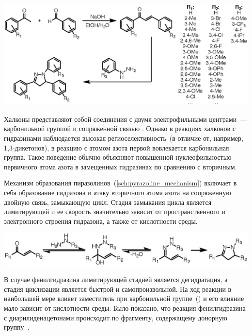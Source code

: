 \begin{scheme}
    \centering
    \includegraphics{sections/literature/img/pyrazolines_common.eps}
    \caption{}
\end{scheme}

Халконы представляют собой соединения с двумя электрофильными центрами~--- карбонильной группой и сопряженной связью .
Однако в реакциях халконов с гидразинами наблюдается высокая региоселективность~(в отличие от, например, 1,3-дикетонов), в реакцию с атомом азота первой вовлекается карбонильная группа.
Такое поведение обычно объясняют повышенной нуклеофильностью первичного атома азота в замещенных гидразинах по сравнению с вторичным.

Механизм образования пиразолинов~(\ref{sch:pyrazoline_mechanism}) включает в себя образование гидразона и атаку вторичного атома азота на сопряженную двойную связь, замыкающую цикл.
Стадия замыкания цикла является лимитирующей и ее скорость значительно зависит от пространственного и электронного строения гидразона, а также от кислотности среды.

\begin{scheme}
    \centering
    \includegraphics{sections/literature/img/pyrazoline_mechanism.eps}
    \caption{}
    \label{sch:pyrazoline_mechanism}
\end{scheme}

В случае фенилгидразина лимитирующей стадией является дегидратация, а стадия циклизации является быстрой и самопроизвольной.
На ход реакции в наибольшей мере влияет заместитель при карбонильной группе~() и его влияние мало зависит от кислотности среды.
Было показано, что реакция фенилгидразина с диарилиденацетонами происходит по фрагменту, содержащему донорную группу~\cite{Chebanov2008}.

